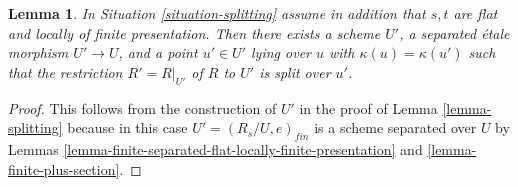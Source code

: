\documentclass{stacks-project}
\theoremstyle{plain}
\newtheorem{lemma}[subsection]{Lemma}
\theoremstyle{definition}
\theoremstyle{remark}
\numberwithin{equation}{subsection}
\begin{document}
\begin{lemma}
\label{lemma-splitting-scheme}
In Situation \ref{situation-splitting} assume in addition that
$s, t$ are flat and locally of finite presentation.
Then there exists a scheme $U'$, a separated \'etale morphism
$U' \to U$, and a point $u' \in U'$
lying over $u$ with $\kappa(u) = \kappa(u')$
such that the restriction $R' = R|_{U'}$ of $R$ to $U'$
is split over $u'$.
\end{lemma}

\begin{proof}
This follows from the construction of $U'$ in the proof of
Lemma \ref{lemma-splitting}
because in this case $U' = (R_s/U, e)_{fin}$ is a scheme separated over
$U$ by
Lemmas \ref{lemma-finite-separated-flat-locally-finite-presentation} and
\ref{lemma-finite-plus-section}.
\end{proof}
\end{document}
